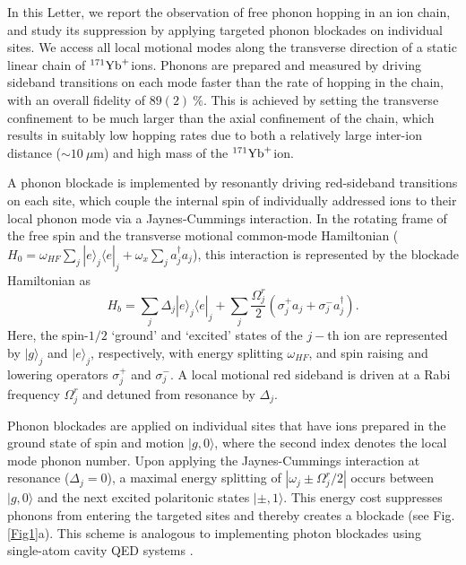 \documentclass[groupaddress,9pt,twocolumn,superscriptaddress, aps, prl]{revtex4-1}
\newcommand{\ket}[1]{|#1\rangle}
\newcommand{\bra}[1]{\langle #1|}
\newcommand{\Yb}{$^{171}{\rm{Yb}}^{+} $}
\begin{document}
In this Letter, we report the observation of free phonon hopping in an ion chain, and study its suppression by applying targeted phonon blockades on individual sites. We access all local motional modes along the transverse direction of a static linear chain of \Yb ions. Phonons are prepared and measured by driving sideband transitions on each mode faster than the rate of hopping in the chain, with an overall fidelity of $89(2)\:\%$. This is achieved by setting the transverse confinement to be much larger than the axial confinement of the chain, which results in suitably low hopping rates due to both a relatively large inter-ion distance ($\sim 10\:\mu$m) and high mass of the \Yb ion.

A phonon blockade is implemented by resonantly driving red-sideband transitions on each site, which couple the internal spin of individually addressed ions to their local phonon mode via a Jaynes-Cummings interaction. In the rotating frame of the free spin and the transverse motional common-mode Hamiltonian ($H_0=\omega_{HF}\sum_j\ket{e}_j\bra{e}_j+\omega_x\sum_ja^{\dagger}_ja_j$), this interaction is represented by the blockade Hamiltonian as
\begin{equation}
H_b=\sum_{j}\Delta_j\ket{e}_j\bra{e}_j+\sum_{j}\frac{\Omega_j^r}{2}(\sigma^+_j a_j  +\sigma^-_j a^{\dagger}_j).
\label{Eq2}
\end{equation}
Here, the spin-$1/2$ `ground' and `excited' states of the $j-$th ion are represented by $\ket{g}_j$ and $\ket{e}_j$, respectively, with energy splitting $\omega_{HF}$, and spin raising and lowering operators $\sigma^+_j$ and $\sigma^-_j$. A local motional red sideband is driven at a Rabi frequency $\Omega_j^r$ and detuned from resonance by $\Delta_j$.

Phonon blockades are applied on individual sites that have ions prepared in the ground state of spin and motion $\ket{g,0}$, where the second index denotes the local mode phonon number. Upon applying the Jaynes-Cummings interaction at resonance ($\Delta_j=0$), a maximal energy splitting of $|\omega_j\pm\Omega^r_j/2|$ occurs between $\ket{g,0}$ and the next excited polaritonic states $\ket{\pm, 1}$. This energy cost suppresses phonons from entering the targeted sites and thereby creates a blockade (see Fig. \ref{Fig1}a). This scheme is analogous to implementing photon blockades using single-atom cavity QED systems \cite{Hamsen2017}.
\end{document}
